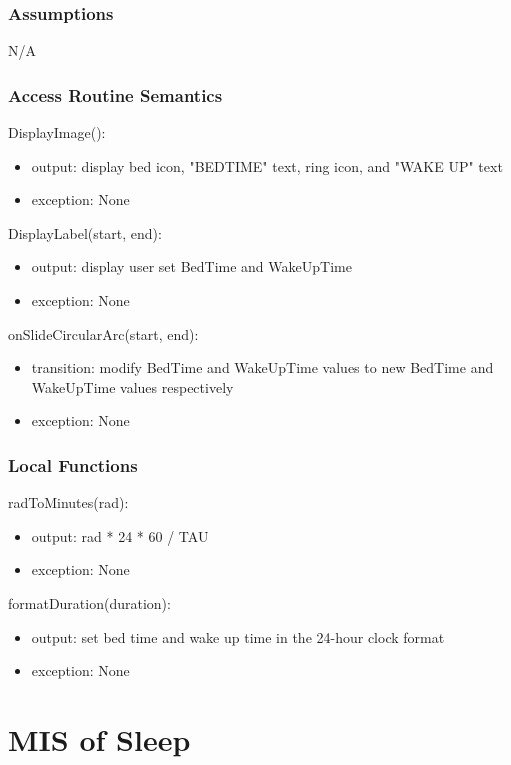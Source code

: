 \documentclass[12pt, titlepage]{article}
\begin{document}
\subsubsection{Assumptions}
N/A

\subsubsection{Access Routine Semantics}

\noindent DisplayImage():
\begin{itemize}
	\item output: display bed icon, "BEDTIME" text, ring icon, and "WAKE UP" text
	\item exception: None
\end{itemize}

\noindent DisplayLabel(start, end):
\begin{itemize}
	\item output: display user set BedTime and WakeUpTime
	\item exception: None
\end{itemize}

\noindent onSlideCircularArc(start, end):
\begin{itemize}
	\item transition: modify BedTime and WakeUpTime values to new BedTime and WakeUpTime values respectively
	\item exception: None
\end{itemize}

\subsubsection{Local Functions}

\noindent radToMinutes(rad):
\begin{itemize}
	\item output: rad * 24 * 60 / TAU
	\item exception: None 
\end{itemize}

\noindent formatDuration(duration):
\begin{itemize}
	\item output: set bed time and wake up time in the 24-hour clock format
	\item exception: None 
\end{itemize}

\section{MIS of Sleep} \label{Module} 
\end{document}
